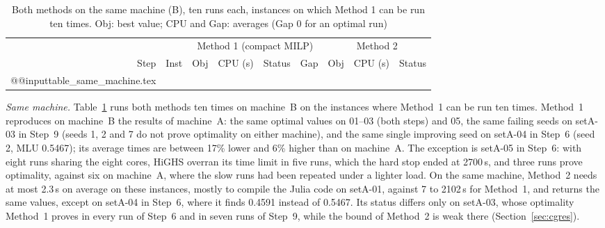 \documentclass[conference]{IEEEtran}
\begin{document}
\begin{table}[t]
\centering\footnotesize
\caption{Both methods on the same machine (B), ten runs each, instances on which Method 1 can be run ten times. Obj: best value; CPU and Gap: averages (Gap 0 for an optimal run)}\label{tab:same}
\setlength{\tabcolsep}{2.6pt}
\begin{tabular}{@{}rr|rrlr|rrl@{}}
\toprule
 & & \multicolumn{4}{c|}{Method 1 (compact MILP)} & \multicolumn{3}{c}{Method 2}\\
Step & Inst & Obj & CPU (s) & Status & Gap & Obj & CPU (s) & Status\\
\midrule
\csname @@input\endcsname table_same_machine.tex
\bottomrule
\end{tabular}
\par{}
\end{table}

\emph{Same machine.} Table~\ref{tab:same} runs both methods ten times on machine~B on the instances where Method~1 can be run ten times. Method~1 reproduces on machine~B the results of machine~A: the same optimal values on 01--03 (both steps) and 05, the same failing seeds on setA-03 in Step~9 (seeds 1, 2 and 7 do not prove optimality on either machine), and the same single improving seed on setA-04 in Step~6 (seed 2, MLU 0.5467); its average times are between 17\% lower and 6\% higher than on machine~A. The exception is setA-05 in Step~6: with eight runs sharing the eight cores, HiGHS overran its time limit in five runs, which the hard stop ended at 2700\,s, and three runs prove optimality, against six on machine~A, where the slow runs had been repeated under a lighter load. On the same machine, Method~2 needs at most 2.3\,s on average on these instances, mostly to compile the Julia code on setA-01, against 7 to 2102\,s for Method~1, and returns the same values, except on setA-04 in Step~6, where it finds 0.4591 instead of 0.5467. Its status differs only on setA-03, whose optimality Method~1 proves in every run of Step~6 and in seven runs of Step~9, while the bound of Method~2 is weak there (Section~\ref{sec:cgres}).
\end{document}
